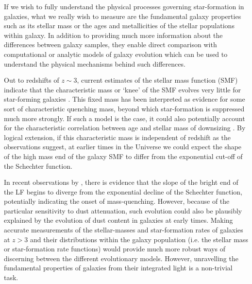 If we wish to fully understand the physical processes governing star-formation in galaxies, what we really wish to measure are the fundamental galaxy properties such as its stellar mass or the ages and metallicities of the stellar populations within galaxy. In addition to providing much more information about the differences between galaxy samples, they enable direct comparison with computational or analytic models of galaxy evolution which can be used to understand the physical mechanisms behind such differences.

Out to redshifts of $z\sim3$, current estimates of the stellar mass function (SMF) indicate that the characteristic mass or `knee' of the SMF evolves very little for star-forming galaxies \citep{Ilbert:2013dq,Muzzin:2013bl}. This fixed mass has been interpreted as evidence for some sort of characteristic quenching mass, beyond which star-formation is suppressed much more strongly. If such a model is the case, it could also potentially account for the characteristic correlation between age and stellar mass of downsizing \citep{Peng:2010gn}. By logical extension, if this characteristic mass is independent of redshift as the observations suggest, at earlier times in the Universe we could expect the shape of the high mass end of the galaxy SMF to differ from the exponential cut-off of the Schechter function. 

In recent observations by \citet{Bowler:2013wz}, there is evidence that the slope of the bright end of the LF begins to diverge from the exponential decline of the Schechter function, potentially indicating the onset of mass-quenching. However, because of the particular sensitivity to dust attenuation, such evolution could also be plausibly explained by the evolution of dust content in galaxies at early times. Making accurate measurements of the stellar-masses and star-formation rates of galaxies at $z > 3$ and their distributions within the galaxy population (i.e. the stellar mass or star-formation rate functions) would provide much more robust ways of discerning between the different evolutionary models. However, unravelling the fundamental properties of galaxies from their integrated light is a non-trivial task.


